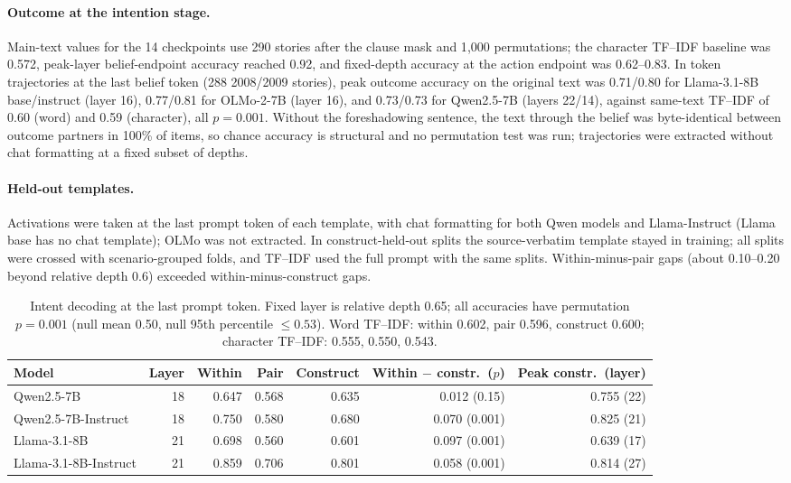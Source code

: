 \paragraph{Outcome at the intention stage.}
Main-text values for the 14 checkpoints use 290 stories after the clause mask and 1{,}000 permutations; the character TF--IDF baseline was 0.572, peak-layer belief-endpoint accuracy reached 0.92, and fixed-depth accuracy at the action endpoint was 0.62--0.83.
In token trajectories at the last belief token (288 2008/2009 stories), peak outcome accuracy on the original text was 0.71/0.80 for Llama-3.1-8B base/instruct (layer 16), 0.77/0.81 for OLMo-2-7B (layer 16), and 0.73/0.73 for Qwen2.5-7B (layers 22/14), against same-text TF--IDF of 0.60 (word) and 0.59 (character), all $p=0.001$.
Without the foreshadowing sentence, the text through the belief was byte-identical between outcome partners in 100\% of items, so chance accuracy is structural and no permutation test was run; trajectories were extracted without chat formatting at a fixed subset of depths.

\paragraph{Held-out templates.}
\label{sec:supp-templates}
Activations were taken at the last prompt token of each template, with chat formatting for both Qwen models and Llama-Instruct (Llama base has no chat template); OLMo was not extracted.
In construct-held-out splits the source-verbatim template stayed in training; all splits were crossed with scenario-grouped folds, and TF--IDF used the full prompt with the same splits.
Within-minus-pair gaps (about 0.10--0.20 beyond relative depth 0.6) exceeded within-minus-construct gaps.

\begin{table}[h]
\centering
\footnotesize
\caption{Intent decoding at the last prompt token. Fixed layer is relative depth 0.65; all accuracies have permutation $p=0.001$ (null mean 0.50, null 95th percentile $\leq0.53$). Word TF--IDF: within 0.602, pair 0.596, construct 0.600; character TF--IDF: 0.555, 0.550, 0.543.}
\label{tab:templates}
\begin{tabular}{@{}lrrrrrr@{}}
\toprule
Model & Layer & Within & Pair & Construct & Within $-$ constr.\ ($p$) & Peak constr.\ (layer) \\
\midrule
Qwen2.5-7B & 18 & 0.647 & 0.568 & 0.635 & 0.012 (0.15) & 0.755 (22) \\
Qwen2.5-7B-Instruct & 18 & 0.750 & 0.580 & 0.680 & 0.070 (0.001) & 0.825 (21) \\
Llama-3.1-8B & 21 & 0.698 & 0.560 & 0.601 & 0.097 (0.001) & 0.639 (17) \\
Llama-3.1-8B-Instruct & 21 & 0.859 & 0.706 & 0.801 & 0.058 (0.001) & 0.814 (27) \\
\bottomrule
\end{tabular}
\end{table}

